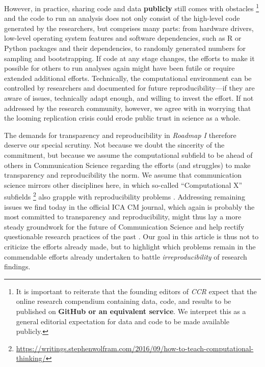 However, in practice, sharing code and data \textbf{publicly} still comes with obstacles \footnote{It is important to reiterate that the founding editors of \textit{CCR} expect that the online research compendium containing data, code, and results to be published on \textbf{GitHub or an equivalent service}. We interpret this as a general editorial expectation for data and code to be made available publicly. } and the code to run an analysis does not only consist of the high-level code generated by the researchers, but comprises many parts:
from hardware drivers, low-level operating system features and software dependencies, such as R or Python packages and their dependencies, to randomly generated numbers for sampling and bootstrapping.
If code at any stage changes, the efforts to make it possible for others to run analyses again might have been futile or require extended additional efforts.
Technically, the computational environment can be controlled by researchers and documented for future reproducibility---if they are aware of issues, technically adapt enough, and willing to invest the effort.
If not addressed by the research community, however, we agree with \textcite{mede:2020} in worrying that the looming replication crisis could erode public trust in science as a whole.

The demands for transparency and reproducibility in \textit{Roadmap I} therefore deserve our special scrutiny.
Not because we doubt the sincerity of the commitment, but because we assume the computational subfield to be ahead of others in Communication Science regarding the efforts (and struggles) to make transparency and reproducibility the norm.
We assume that communication science mirrors other disciplines here, in which so-called ``Computational X'' subfields \footnote{\url{https://writings.stephenwolfram.com/2016/09/how-to-teach-computational-thinking/}} also grapple with reproducibility problems \parencite[e.g.][]{hothorn:2011:C, hutson:2018:M, ioannidis:2009:R}.
Addressing remaining issues we find today in the official ICA CM journal, which again is probably the most committed to transparency and reproducibility, might thus lay a more steady groundwork for the future of Communication Science and help rectify questionable research practices of the past \parencite[]{bakker:2021:QOR,matthes:2015:QRP}.
Our goal in this article is thus not to criticize the efforts already made, but to highlight which problems remain in the commendable efforts already undertaken to battle \emph{irreproducibility} of research findings.

